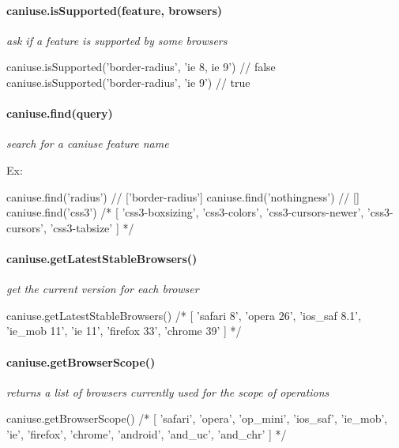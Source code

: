 \paragraph*{{\ttfamily caniuse.\+is\+Supported(feature, browsers)}}

{\itshape ask if a feature is supported by some browsers}


\begin{DoxyCode}
caniuse.isSupported('border-radius', 'ie 8, ie 9') // false
caniuse.isSupported('border-radius', 'ie 9') // true
\end{DoxyCode}


\paragraph*{{\ttfamily caniuse.\+find(query)}}

{\itshape search for a caniuse feature name}

Ex\+:


\begin{DoxyCode}
caniuse.find('radius') // ['border-radius']
caniuse.find('nothingness') // []
caniuse.find('css3')
/*
[ 'css3-boxsizing',
  'css3-colors',
  'css3-cursors-newer',
  'css3-cursors',
  'css3-tabsize' ]
*/
\end{DoxyCode}


\paragraph*{{\ttfamily caniuse.\+get\+Latest\+Stable\+Browsers()}}

{\itshape get the current version for each browser}


\begin{DoxyCode}
caniuse.getLatestStableBrowsers()
/*
[ 'safari 8',
  'opera 26',
  'ios\_saf 8.1',
  'ie\_mob 11',
  'ie 11',
  'firefox 33',
  'chrome 39' ]
*/
\end{DoxyCode}


\paragraph*{{\ttfamily caniuse.\+get\+Browser\+Scope()}}

{\itshape returns a list of browsers currently used for the scope of operations}


\begin{DoxyCode}
caniuse.getBrowserScope()
/*
[ 'safari',
  'opera',
  'op\_mini',
  'ios\_saf',
  'ie\_mob',
  'ie',
  'firefox',
  'chrome',
  'android',
  'and\_uc',
  'and\_chr' ]
*/
\end{DoxyCode}


